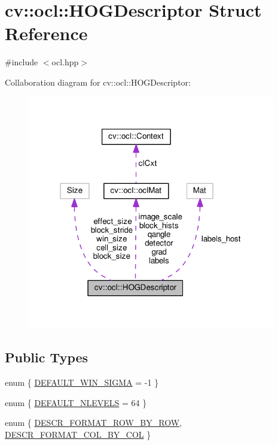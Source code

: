 \hypertarget{structcv_1_1ocl_1_1HOGDescriptor}{\section{cv\-:\-:ocl\-:\-:H\-O\-G\-Descriptor Struct Reference}
\label{structcv_1_1ocl_1_1HOGDescriptor}
}


{\ttfamily \#include $<$ocl.\-hpp$>$}



Collaboration diagram for cv\-:\-:ocl\-:\-:H\-O\-G\-Descriptor\-:\nopagebreak
\begin{figure}[H]
\begin{center}
\leavevmode
\includegraphics[width=307pt]{structcv_1_1ocl_1_1HOGDescriptor__coll__graph}
\end{center}
\end{figure}
\subsection*{Public Types}
\begin{DoxyCompactItemize}
\item 
enum \{ \hyperlink{structcv_1_1ocl_1_1HOGDescriptor_a15ea7c60854f4623d645e9cf7cf9b69ba18bf6dea38c97cf555b692fb916e1803}{D\-E\-F\-A\-U\-L\-T\-\_\-\-W\-I\-N\-\_\-\-S\-I\-G\-M\-A} = -\/1
 \}
\item 
enum \{ \hyperlink{structcv_1_1ocl_1_1HOGDescriptor_a0ea747b7fd46b8ba3ef6a8c0046e2222a8fe4e2e78c3e8e64497d87af9dd8ca20}{D\-E\-F\-A\-U\-L\-T\-\_\-\-N\-L\-E\-V\-E\-L\-S} = 64
 \}
\item 
enum \{ \hyperlink{structcv_1_1ocl_1_1HOGDescriptor_a5c0042000c5db61a1c3fa8c54fccffeca2585a6b35b1f73d04c4d8f0df2a924ca}{D\-E\-S\-C\-R\-\_\-\-F\-O\-R\-M\-A\-T\-\_\-\-R\-O\-W\-\_\-\-B\-Y\-\_\-\-R\-O\-W}, 
\hyperlink{structcv_1_1ocl_1_1HOGDescriptor_a5c0042000c5db61a1c3fa8c54fccffeca5f7459a35f56ad3745c725e88a9d7539}{D\-E\-S\-C\-R\-\_\-\-F\-O\-R\-M\-A\-T\-\_\-\-C\-O\-L\-\_\-\-B\-Y\-\_\-\-C\-O\-L}
 \}
\end{DoxyCompactItemize}
